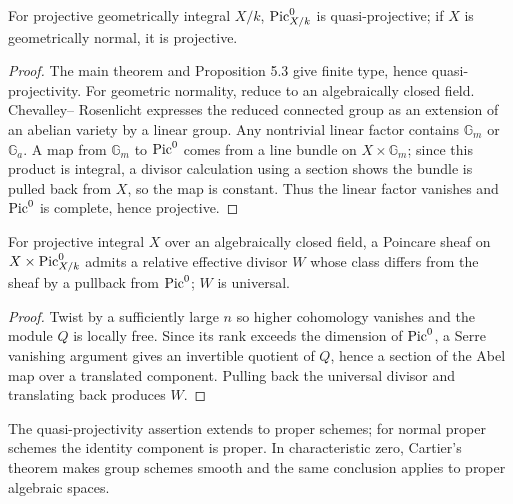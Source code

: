 \begin{theorem}\label{kps-thm-pic0-projective}
For projective geometrically integral $X/k$, $\operatorname{Pic}^0_{X/k}$ is quasi-projective;
if $X$ is geometrically normal, it is projective.
\end{theorem}
\begin{proof}
The main theorem and Proposition 5.3 give finite type, hence quasi-projectivity.
For geometric normality, reduce to an algebraically closed field. Chevalley--
Rosenlicht expresses the reduced connected group as an extension of an abelian
variety by a linear group. Any nontrivial linear factor contains $\mathbb G_m$
or $\mathbb G_a$. A map from $\mathbb G_m$ to $\operatorname{Pic}^0$ comes from a line bundle on
$X\times\mathbb G_m$; since this product is integral, a divisor calculation
using a section shows the bundle is pulled back from $X$, so the map is constant.
Thus the linear factor vanishes and $\operatorname{Pic}^0$ is complete, hence projective.
\end{proof}

\begin{corollary}\label{kps-cor-poincare}
For projective integral $X$ over an algebraically closed field, a Poincare
sheaf on $X\times\operatorname{Pic}^0_{X/k}$ admits a relative effective divisor $W$ whose
class differs from the sheaf by a pullback from $\operatorname{Pic}^0$; $W$ is universal.
\end{corollary}
\begin{proof}
Twist by a sufficiently large $n$ so higher cohomology vanishes and the module
$Q$ is locally free. Since its rank exceeds the dimension of $\operatorname{Pic}^0$, a Serre
vanishing argument gives an invertible quotient of $Q$, hence a section of the
Abel map over a translated component. Pulling back the universal divisor and
translating back produces $W$.
\end{proof}

\begin{remark}\label{kps-rmk-pic0-variants}
The quasi-projectivity assertion extends to proper schemes; for normal proper
schemes the identity component is proper. In characteristic zero, Cartier's
theorem makes group schemes smooth and the same conclusion applies to proper
algebraic spaces.
\end{remark}

